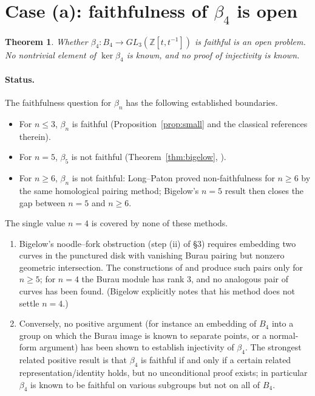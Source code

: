 \documentclass{amsart}
\newtheorem{theorem}{Theorem}
\theoremstyle{remark}
\begin{document}
\section{Case (a): faithfulness of $\beta_4$ is open}

\begin{theorem}\label{thm:open}
Whether $\beta_4:B_4\to GL_3(\mathbb Z[t,t^{-1}])$ is faithful is an open
problem. No nontrivial element of $\ker\beta_4$ is known, and no proof of
injectivity is known.
\end{theorem}

\paragraph{Status.}
The faithfulness question for $\beta_n$ has the following established
boundaries.
\begin{itemize}
\item For $n\le 3$, $\beta_n$ is faithful (Proposition~\ref{prop:small} and the
classical references therein).
\item For $n=5$, $\beta_5$ is not faithful (Theorem~\ref{thm:bigelow},
\cite{Bigelow1999}).
\item For $n\ge 6$, $\beta_n$ is not faithful: Long--Paton \cite{LongPaton}
proved non-faithfulness for $n\ge 6$ by the same homological pairing method;
Bigelow's $n=5$ result then closes the gap between $n=5$ and $n\ge6$.
\end{itemize}

The single value $n=4$ is covered by none of these methods.
\begin{enumerate}
\item Bigelow's noodle--fork obstruction (step (ii) of \S3) requires embedding
two curves in the punctured disk with vanishing Burau pairing but nonzero
geometric intersection. The constructions of \cite{Bigelow1999} and
\cite{LongPaton} produce such pairs only for $n\ge5$; for $n=4$ the Burau
module has rank $3$, and no analogous pair of curves has been found. (Bigelow
explicitly notes that his method does not settle $n=4$.)
\item Conversely, no positive argument (for instance an embedding of $B_4$ into
a group on which the Burau image is known to separate points, or a normal-form
argument) has been shown to establish injectivity of $\beta_4$. The strongest
related positive result is that $\beta_4$ is faithful if and only if a certain
related representation/identity holds, but no unconditional proof exists; in
particular $\beta_4$ is known to be faithful on various subgroups but not on all
of $B_4$.
\end{enumerate}
\end{document}
